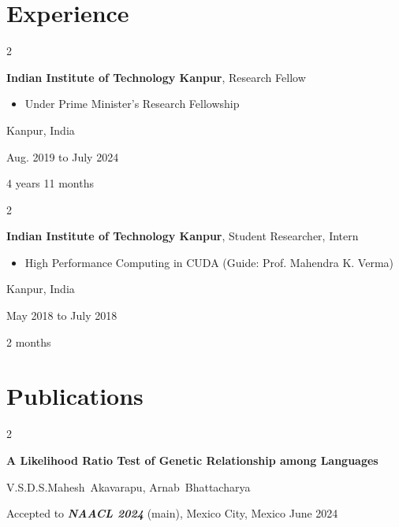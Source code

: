 \documentclass[12pt, letterpaper]{article}
\newenvironment{highlights}{
    \begin{itemize}[
        topsep=0.10 cm,
        parsep=0.10 cm,
        partopsep=0pt,
        itemsep=0pt,
        leftmargin=0.4 cm + 10pt
    ]
}{
    \end{itemize}
} %
\newenvironment{twocolentry}[2][]{
    \onecolentry
    \def\secondColumn{#2}
    \setcolumnwidth{\fill, 4.5 cm}
    \begin{paracol}{2}
}{
    \switchcolumn \raggedleft \secondColumn
    \end{paracol}
    \endonecolentry
} %
\begin{document}
    
    \section{Experience}



        
        \begin{twocolentry}{
            Kanpur, India

        Aug. 2019 to July 2024

        4 years 11 months
        }
            \textbf{Indian Institute of Technology Kanpur}, Research Fellow
            \begin{highlights}
                \item Under Prime Minister's Research Fellowship
            \end{highlights}
        \end{twocolentry}


        \vspace{0.2 cm}

        \begin{twocolentry}{
            Kanpur, India

        May 2018 to July 2018

        2 months
        }
            \textbf{Indian Institute of Technology Kanpur}, Student Researcher, Intern
            \begin{highlights}
                \item High Performance Computing in CUDA (Guide: Prof. Mahendra K. Verma)
            \end{highlights}
        \end{twocolentry}



    
    \section{Publications}



        
        \begin{samepage}
            \begin{twocolentry}{
                June 2024
            }
                \textbf{A Likelihood Ratio Test of Genetic Relationship among Languages}

                \vspace{0.10 cm}

                \mbox{V.S.D.S.Mahesh Akavarapu}, \mbox{Arnab Bhattacharya}
                \vspace{0.10 cm}

        Accepted to \textbf{\textit{NAACL 2024}} (main), Mexico City, Mexico    \end{twocolentry}
        \end{samepage}
\end{document}
